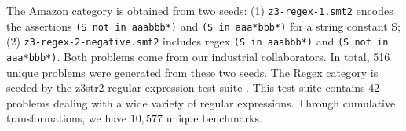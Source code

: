 \begin{table}[t]
\centering
\caption{Transformed problem sets generated by \transformer{}.}
\label{tbl:transformed}
{
  \footnotesize
  \bgroup
  \def\arraystretch{1}
  \egroup
  \vspace{-0.2in}
}
\end{table}


The Amazon category is obtained from two seeds: (1)
\texttt{z3-regex-1.smt2} encodes the assertions \texttt{(S not in
  aaabbb*)} and \texttt{(S in aaa*bbb*)} for a string constant S; (2)
\texttt{z3-regex-2-negative.smt2} includes regex \texttt{(S in
  aaabbb*)} and \texttt{(S not in aaa*bbb*)}.  Both problems come from
our industrial collaborators. In total, 516 unique problems were
generated from these two seeds. The Regex category is seeded by the
z3str2 regular expression test suite \cite{z3str2-tests}.  This test
suite contains 42 problems dealing with a wide variety of regular
expressions.  Through cumulative transformations, we have $10,577$
unique benchmarks.



